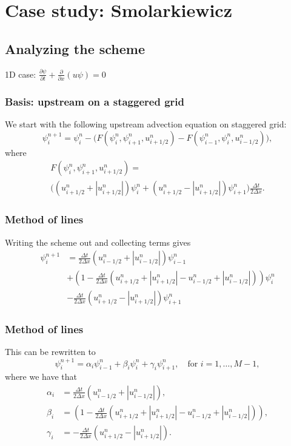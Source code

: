 \documentclass[hyperref={pdfstartview=Fit,pdfpagemode=FullScreen}]{beamer}
\providecommand{\abs}[1]{\left\lvert#1\right\rvert}
\begin{document}
\section{Case study: Smolarkiewicz}
\subsection{Analyzing the scheme}

\begin{frame}
1D case: $\frac{\partial \psi}{\partial t} + \frac{\partial}{\partial x}(u\psi) = 0$
\vspace{0.3cm}

\frametitle{Basis: upstream on a staggered grid}
We start with the following upstream advection equation on staggered grid:
\begin{equation*}
 \psi_i^{n+1} = \psi_i^n - \Big( F \left( \psi_i^n,\psi_{i+1}^n,u_{i+1/2}^n\right)
-F \left( \psi_{i-1}^n,\psi_{i}^n,u_{i-1/2}^n\right) \Big),
\end{equation*}
where
\begin{multline*}
F \left( \psi_i^n,\psi_{i+1}^n,u_{i+1/2}^n\right) =\\
\Big( \left( u_{i+1/2}^n + \abs{u_{i+1/2}^n} \right) \psi_i^n
+ \left( u_{i+1/2}^n - \abs{u_{i+1/2}^n} \right) \psi_{i+1}^n \Big)
\frac{\Delta t}{2 \Delta x}.
\end{multline*}
\end{frame}

\begin{frame}
\frametitle{Method of lines}
Writing the scheme out and collecting terms gives
\begin{equation*}
\begin{split}
\psi_i^{n+1} &=
\frac{\Delta t}{2 \Delta x} \left( u_{i-1/2}^n + \abs{u_{i-1/2}^n} \right) \psi_{i-1}^n\\
&+ \left(1 - \frac{\Delta t}{2 \Delta x} \left( u_{i+1/2}^n + \abs{u_{i+1/2}^n} - u_{i-1/2}^n + \abs{u_{i-1/2}^n} \right) \right) \psi_i^n\\
&-\frac{\Delta t}{2 \Delta x} \left( u_{i+1/2}^n - \abs{u_{i+1/2}^n} \right) \psi_{i+1}^n
\end{split}
\end{equation*}
\end{frame}

\begin{frame}
\frametitle{Method of lines}
This can be rewritten to 
\begin{equation*}
\psi_i^{n+1} = \alpha_i \psi_{i-1}^n + \beta_i \psi_i^n +\gamma_i \psi_{i+1}^n, \quad \text{for } i=1,\ldots,M-1,
\end{equation*}
 where we have that
\begin{align*}
\alpha_i &= \frac{\Delta t}{2 \Delta x} \left( u_{i-1/2}^n + \abs{u_{i-1/2}^n} \right),\\
 \beta_i &= \left(1 - \frac{\Delta t}{2 \Delta x} \left( u_{i+1/2}^n + \abs{u_{i+1/2}^n} - u_{i-1/2}^n + \abs{u_{i-1/2}^n} \right) \right),\\
\gamma_i &= -\frac{\Delta t}{2 \Delta x} \left( u_{i+1/2}^n - \abs{u_{i+1/2}^n} \right).
\end{align*}
\end{frame}
\end{document}
